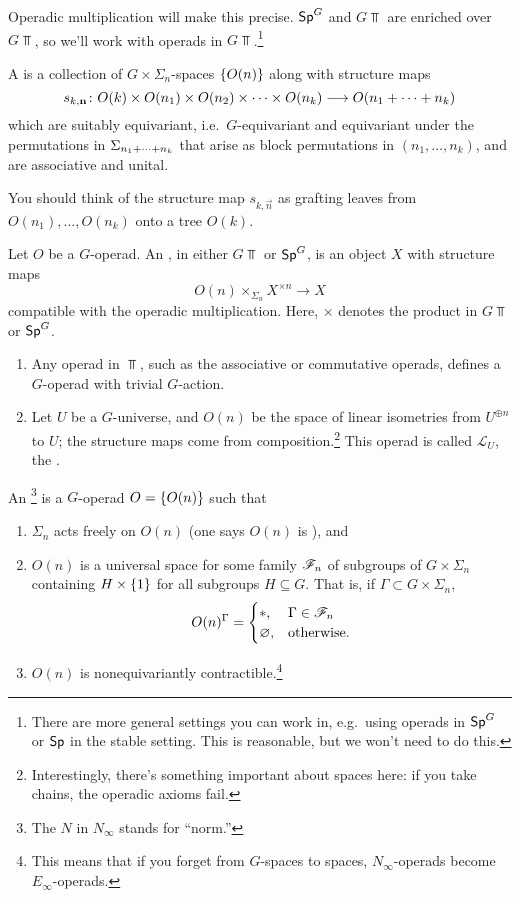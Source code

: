 Operadic multiplication will make this precise. $\mathsf{Sp}^G$ and $G\Top$ are enriched over $G\Top$, so we'll work with
operads in $G\Top$.\footnote{There are more general settings you can work in, e.g.\ using operads in $\mathsf{Sp}^G$ or
$\mathsf{Sp}$ in the stable setting. This is reasonable, but we won't need to do this.}
\begin{defn}
A  is a collection of $G\times\Sigma_n$-spaces $\{O(n)\}$ along with structure maps
\[s_{k,\boldsymbol{\mathbf{n}}}\colon O(k)\times O(n_1)\times O(n_2)\times \dotsb \times O(n_k)\longrightarrow O(n_1+ \dotsb + n_k)\]
which are suitably equivariant, i.e.\ $G$-equivariant and equivariant under the permutations in $\Sigma_{n_1+ \dotsb +
n_k}$ that arise as block permutations in $(n_1,\dotsc,n_k)$, and are associative and unital.
\end{defn}
You should think of the structure map $s_{k,\vec n}$ as grafting leaves from $O(n_1),\dotsc,O(n_k)$ onto a tree
$O(k)$.
\begin{defn}
Let $O$ be a $G$-operad. An , in either $G\Top$ or $\mathsf{Sp}^G$, is an object $X$ with structure maps
\[O(n)\times_{\Sigma_n} X^{\times n}\longrightarrow X\]
compatible with the operadic multiplication. Here, $\times$ denotes the product in $G\Top$ or $\mathsf{Sp}^G$.
\end{defn}
\begin{exm}\hfill
\label{Gopexm}
\begin{enumerate}
	\item Any operad in $\Top$, such as the associative or commutative operads, defines a $G$-operad with trivial
	$G$-action.
	\item Let $U$ be a $G$-universe, and $O(n)$ be the space of linear isometries from $U^{\oplus n}$ to $U$; the
	structure maps come from composition.\footnote{Interestingly, there's something important about spaces here: if
	you take chains, the operadic axioms fail.} This operad is called $\mathcal L_U$, the .
	\qedhere
\end{enumerate}
\end{exm}
\begin{defn}
\label{ninfty}
An \footnote{The $N$ in $N_{\infty}$ stands for ``norm.''} is a $G$-operad $O = \{O(n)\}$
such that
\begin{enumerate}
	\item $\Sigma_n$ acts freely on $O(n)$ (one says $O(n)$ is ), and
	\item $O(n)$ is a universal space for some family $\mathscr F_n$ of subgroups of $G\times\Sigma_n$ containing
	$H\times\{1\}$ for all subgroups $H\subseteq G$. That is, if $\Gamma\subset G\times\Sigma_n$,
	\[O(n)^\Gamma = \begin{cases}
		*, &\Gamma\in\mathscr F_n\\
		\varnothing, &\text{otherwise.}
	\end{cases}\]
	\item $O(n)$ is nonequivariantly contractible.\footnote{This means that if you forget from $G$-spaces to
	spaces, $N_\infty$-operads become $E_\infty$-operads.}
\end{enumerate}
\end{defn}
